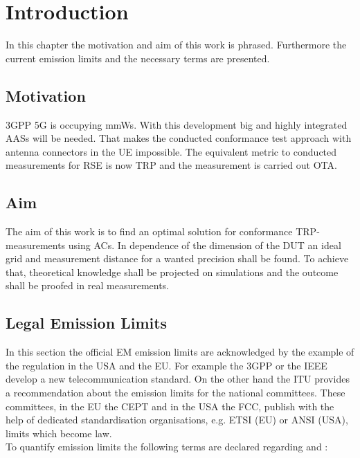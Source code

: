 \chapter{Introduction}

In this chapter the motivation and aim of this work is phrased. Furthermore the current emission limits and the necessary terms are presented.

\section{Motivation}

\ac{3GPP} \ac{5G} is occupying \acp{mmW}. With this development big and highly integrated  \acp{AAS} will be needed. That makes the conducted conformance test approach with antenna connectors in the \ac{UE} impossible. The equivalent metric to conducted measurements for \ac{RSE} is now \ac{TRP} and the measurement is carried out \ac{OTA}.

\section{Aim}

The aim of this work is to find an optimal solution for conformance  \ac{TRP}-measurements using \acp{AC}. In dependence of the dimension of the \ac{DUT} an ideal grid and measurement distance for a wanted precision shall be found. To achieve that, theoretical knowledge shall be projected on simulations and the outcome shall be proofed in real measurements.

\section{Legal Emission Limits}
\label{sec:legem}

In this section the official \ac{EM} emission limits are acknowledged by the example of the regulation in the \ac{USA} and the \ac{EU}. For example the \ac{3GPP} or the \ac{IEEE} develop a new telecommunication standard. On the other hand the \ac{ITU} provides a recommendation about the emission limits for the national committees. These committees, in the \ac{EU} the \ac{CEPT} and in the \ac{USA} the \ac{FCC}, publish with the help of dedicated standardisation organisations, e.g. \ac{ETSI} (\ac{EU}) or \ac{ANSI} (\ac{USA}), limits which become law.\\
To quantify emission limits the following terms are declared regarding \cite{seitur} and \cite{ctiaat}:

